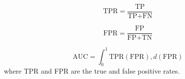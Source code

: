 \begin{equation}
    \text{TPR} = \frac{\text{TP}}{\text{TP} + \text{FN}}
    \label{eq:tpr}
\end{equation}

\begin{equation}
    \text{FPR} = \frac{\text{FP}}{\text{FP} + \text{TN}}
    \label{eq:fpr}
\end{equation}

\begin{equation}
    \text{AUC} = \int_{0}^{1} \text{TPR}(\text{FPR}) , d(\text{FPR})
    \label{eq:auc}
\end{equation}
where TPR and FPR are the true and false positive rates.


